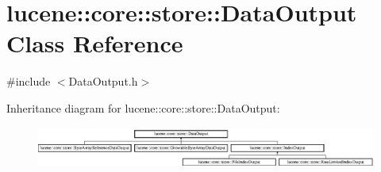 \hypertarget{classlucene_1_1core_1_1store_1_1DataOutput}{}\section{lucene\+:\+:core\+:\+:store\+:\+:Data\+Output Class Reference}
\label{classlucene_1_1core_1_1store_1_1DataOutput}


{\ttfamily \#include $<$Data\+Output.\+h$>$}

Inheritance diagram for lucene\+:\+:core\+:\+:store\+:\+:Data\+Output\+:\begin{figure}[H]
\begin{center}
\leavevmode
\includegraphics[height=1.354839cm]{classlucene_1_1core_1_1store_1_1DataOutput}
\end{center}
\end{figure}
